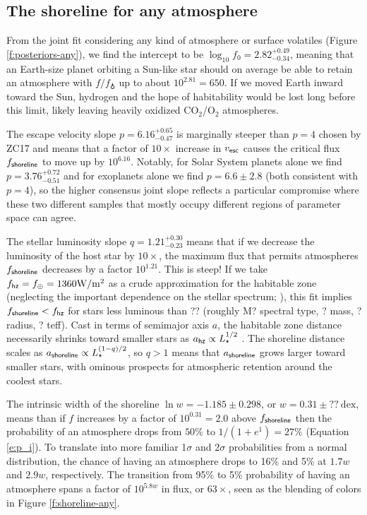 \documentclass[modern,linenumbers,trackchanges]{aastex7}
\begin{document}
\subsection{The shoreline for {\bf any} atmosphere}
From the joint fit considering any kind of atmosphere or surface volatiles (Figure \ref{f:posteriors-any}), we find the intercept to be $\log_{10}{f_0} = 2.82_{-0.34}^{+0.49}$, meaning that an Earth-size planet orbiting a Sun-like star should on average be able to retain an atmosphere with $f/f_\earth$ up to about $10^{2.81} = 650$. If we moved Earth inward toward the Sun, hydrogen and the hope of habitability would be lost long before this limit, likely leaving heavily oxidized CO$_2$/O$_2$ atmospheres.

The escape velocity slope $p = 6.16_{-0.47}^{+0.65}$ is marginally steeper than $p=4$ chosen by ZC17 and means that a factor of $10\times$ increase in $v_{\sf esc}$ causes the critical flux $f_{\sf shoreline}$ to move up by $10^{6.16}$. Notably, for Solar System planets alone we find $p = 3.76_{-0.51}^{+0.72}$ and for exoplanets alone we find $p = 6.6 \pm 2.8$ (both consistent with $p=4$), so the higher consensus joint slope reflects a particular compromise where these two different samples that mostly occupy different regions of parameter space can agree.

The stellar luminosity slope $q = 1.21_{-0.23}^{+0.30}$ means that if we decrease the luminosity of the host star by $10\times$, the maximum flux that permits atmospheres $f_{\sf shoreline}$ decreases by a factor $10^{1.21}$. This is steep! If we take $f_{\sf hz} = f_\oplus = 1360 \mathrm{W/m^2}$ as a crude approximation for the habitable zone (neglecting the important dependence on the stellar spectrum; \citealt{kopparapuHabitableZonesMainsequence2013}), this fit implies $f_{\sf shoreline} < f_{\sf hz}$ for stars less luminous than ?? (roughly M? spectral type, ? mass, ? radius, ? teff). Cast in terms of semimajor axis $a$, the habitable zone distance necessarily shrinks toward smaller stars as $a_{\sf hz} \propto L_\star^{1/2}$ \citep[generally making them easier to observe;][]{blakeNearInfraredMonitoringUltracool2008, nutzmanDesignConsiderationsGroundBased2008a}. The shoreline distance scales as $a_{\sf shoreline} \propto L_\star^{(1-q)/2}$, so $q > 1$ means that $a_{\sf shoreline}$ grows larger toward smaller stars, with ominous prospects for atmospheric retention around the coolest stars.

The intrinsic width of the shoreline $\ln w = -1.185 \pm 0.298$, or $w = 0.31\pm??~\mathrm{dex}$, means than if $f$ increases by a factor of $10^{0.31} = 2.0$ above $f_{\sf shoreline}$ then the probability of an atmosphere drops from $50\%$ to $1/(1 + e^{1}) = 27\%$ (Equation \ref{e:p_i}). To translate into more familiar 1$\sigma$ and 2$\sigma$ probabilities from a normal distribution, the chance of having an atmosphere drops to 16\% and 5\% at $1.7w$ and $2.9w$, respectively. The transition from 95\% to 5\% probability of having an atmosphere spans a factor of $10^{5.8w}$ in flux, or $63\times$, seen as the blending of colors in Figure \ref{f:shoreline-any}. 
\end{document}

